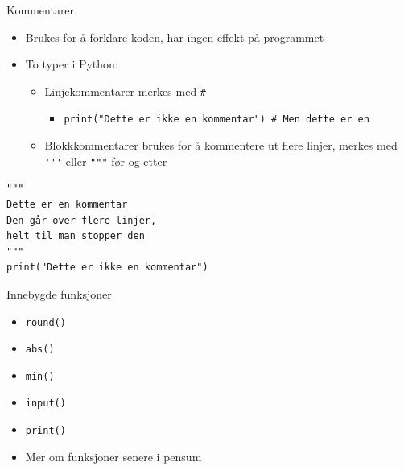 \documentclass[screen, aspectratio=169]{beamer}
\begin{document}

\begin{frame}[fragile]{Kommentarer}
	\begin{itemize}
		\item Brukes for å forklare koden, har ingen effekt på programmet
		\item To typer i Python:
		\begin{itemize}
			\item Linjekommentarer merkes med \lstinline|#|
			\begin{itemize}
				\item \lstinline|print("Dette er ikke en kommentar") # Men dette er en|
			\end{itemize}
			\item Blokkkommentarer brukes for å kommentere ut flere linjer, merkes med \lstinline|'''| eller \lstinline|"""| før og etter
		\end{itemize}
	\end{itemize}
	\begin{lstlisting}
"""
Dette er en kommentar
Den går over flere linjer,
helt til man stopper den
"""
print("Dette er ikke en kommentar")
	\end{lstlisting}
\end{frame}

\begin{frame}[fragile]{Innebygde funksjoner}
	\begin{itemize}
		\item \lstinline|round()|
		\item \lstinline|abs()|
		\item \lstinline|min()|
		\item \lstinline|input()|
		\item \lstinline|print()|
		\vspace{1em}
		\item Mer om funksjoner senere i pensum
	\end{itemize}
\end{frame}
\end{document}
